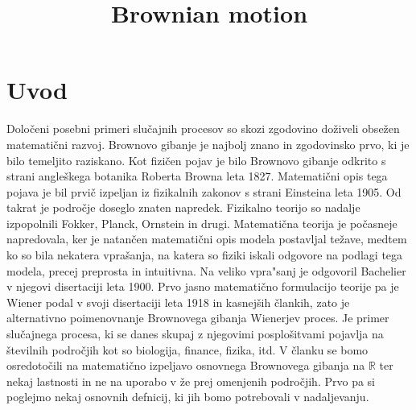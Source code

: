\documentclass[twoside,11pt]{article}
\begin{document}



\klasifikacija{~} 
\title{Brownian motion}

\glava\baselineskip=14.5pt

\smallskip

\section{Uvod}

Določeni posebni primeri slučajnih procesov so skozi zgodovino doživeli obsežen
matematični razvoj. Brownovo gibanje je najbolj znano in zgodovinsko prvo, ki je bilo 
temeljito raziskano. Kot fizičen pojav je
bilo Brownovo gibanje odkrito s strani angleškega botanika Roberta Browna leta 1827.
Matematični opis tega pojava je bil prvič izpeljan iz fizikalnih zakonov s strani 
Einsteina leta 1905. Od takrat je področje doseglo znaten napredek. Fizikalno teorijo 
so nadalje izpopolnili Fokker, Planck, Ornstein in drugi. Matematična 
teorija je počasneje napredovala, ker je natančen matematični opis modela postavljal 
težave, medtem ko so bila nekatera vprašanja, na katera so fiziki iskali odgovore na
podlagi tega modela, precej preprosta in intuitivna. Na veliko vpra"sanj je odgovoril Bachelier
v njegovi disertaciji leta 1900.
Prvo jasno matematično formulacijo teorije pa je Wiener podal v svoji
disertaciji leta 1918 in kasnejših člankih, zato je alternativno poimenovnanje 
Brownovega gibanja Wienerjev proces. Je primer slučajnega procesa, ki se danes skupaj z 
njegovimi posplošitvami pojavlja na številnih področjih kot so biologija, finance, fizika,
itd. V članku se bomo osredotočili na matematično izpeljavo osnovnega Brownovega gibanja 
na $\mathbb{R}$ ter nekaj lastnosti in ne na uporabo v že prej omenjenih področjih.
Prvo pa si poglejmo nekaj osnovnih defnicij, ki jih bomo potrebovali v nadaljevanju.
\end{document}
